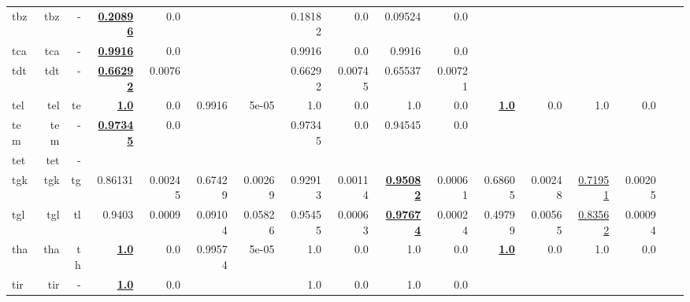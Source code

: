 \documentclass[11pt]{article}
\begin{document}
\begin{table*}[h]
{\begin{tabular}{lrrrrrrrrrrrrrrrr}
tbz         & tbz         & -         & \textbf{\underline{0.20896}}         & 0.0         &          &          & 0.18182         & 0.0         & 0.09524         & 0.0         &          &          &          &          \\
tca         & tca         & -         & \textbf{\underline{0.9916}}         & 0.0         &          &          & 0.9916         & 0.0         & 0.9916         & 0.0         &          &          &          &          \\
tdt         & tdt         & -         & \textbf{\underline{0.66292}}         & 0.0076         &          &          & 0.66292         & 0.00745         & 0.65537         & 0.00721         &          &          &          &          \\
tel         & tel         & te         & \textbf{\underline{1.0}}         & 0.0         & 0.9916         & 5e-05         & 1.0         & 0.0         & 1.0         & 0.0         & \textbf{\underline{1.0}}         & 0.0         & 1.0         & 0.0         \\
tem         & tem         & -         & \textbf{\underline{0.97345}}         & 0.0         &          &          & 0.97345         & 0.0         & 0.94545         & 0.0         &          &          &          &          \\
tet         & tet         & -         &          &          &          &          &          &          &          &          &          &          &          &          \\
tgk         & tgk         & tg         & 0.86131         & 0.00245         & 0.67429         & 0.00269         & 0.92913         & 0.00114         & \textbf{\underline{0.95082}}         & 0.00061         & 0.68605         & 0.00248         & \underline{0.71951}         & 0.00205         \\
tgl         & tgl         & tl         & 0.9403         & 0.0009         & 0.09104         & 0.05826         & 0.95455         & 0.00063         & \textbf{\underline{0.97674}}         & 0.00024         & 0.49799         & 0.00565         & \underline{0.83562}         & 0.00094         \\
tha         & tha         & th         & \textbf{\underline{1.0}}         & 0.0         & 0.99574         & 5e-05         & 1.0         & 0.0         & 1.0         & 0.0         & \textbf{\underline{1.0}}         & 0.0         & 1.0         & 0.0         \\
tir         & tir         & -         & \textbf{\underline{1.0}}         & 0.0         &          &          & 1.0         & 0.0         & 1.0         & 0.0         &          &          &          &          \\

\end{tabular}}
\end{table*}
\end{document}
